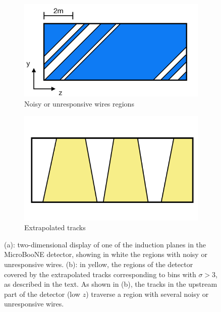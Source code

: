 \documentclass[a4paper,11pt]{article}
\begin{document}
\begin{figure}[htbp]
  \begin{center}
    \begin{subfigure}{0.48\textwidth}
      \includegraphics[width=\linewidth]{figures/chargecoll.png}
      \caption{Noisy or unresponsive wires regions}
    \end{subfigure}
    \begin{subfigure}{0.43\textwidth}
      \includegraphics[width=\linewidth]{figures/extrtracks.png}
      \caption{Extrapolated tracks}
    \end{subfigure}

    \caption{(a): two-dimensional display of one of the induction planes in the MicroBooNE detector, showing in white the regions with noisy or unresponsive wires. (b): in yellow, the regions of the detector covered by the extrapolated tracks corresponding to bins with $\sigma>3$, as described in the text. As shown in (b), the tracks in the upstream part of the detector (low $z$) traverse a region with several noisy or unresponsive wires.} \label{fig:wires}
  \end{center}
\end{figure}
\end{document}

